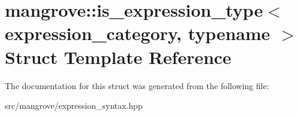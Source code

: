 \hypertarget{structmangrove_1_1is__expression__type}{}\section{mangrove\+:\+:is\+\_\+expression\+\_\+type$<$ expression\+\_\+category, typename $>$ Struct Template Reference}
\label{structmangrove_1_1is__expression__type}


The documentation for this struct was generated from the following file\+:\begin{DoxyCompactItemize}
\item 
src/mangrove/expression\+\_\+syntax.\+hpp\end{DoxyCompactItemize}
